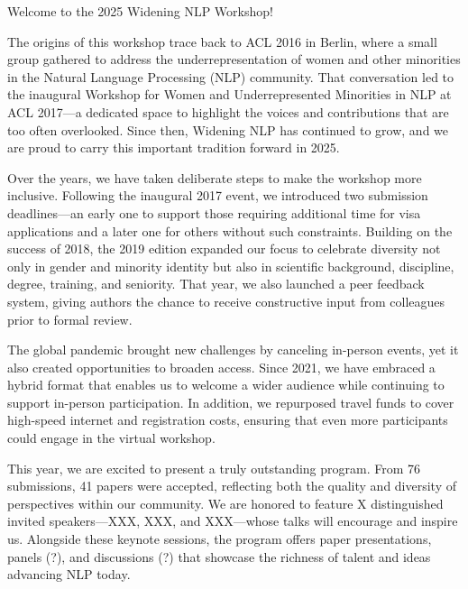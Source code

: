 Welcome to the 2025 Widening NLP Workshop!

\vspace{\baselineskip}

The origins of this workshop trace back to ACL 2016 in Berlin, where a small group gathered to address the underrepresentation of women and other minorities in the Natural Language Processing (NLP) community. That conversation led to the inaugural Workshop for Women and Underrepresented Minorities in NLP at ACL 2017—a dedicated space to highlight the voices and contributions that are too often overlooked. Since then, Widening NLP has continued to grow, and we are proud to carry this important tradition forward in 2025.

\vspace{\baselineskip}

Over the years, we have taken deliberate steps to make the workshop more inclusive. Following the inaugural 2017 event, we introduced two submission deadlines—an early one to support those requiring additional time for visa applications and a later one for others without such constraints. Building on the success of 2018, the 2019 edition expanded our focus to celebrate diversity not only in gender and minority identity but also in scientific background, discipline, degree, training, and seniority. That year, we also launched a peer feedback system, giving authors the chance to receive constructive input from colleagues prior to formal review. 

\vspace{\baselineskip}

The global pandemic brought new challenges by canceling in-person events, yet it also created opportunities to broaden access. Since 2021, we have embraced a hybrid format that enables us to welcome a wider audience while continuing to support in-person participation. In addition, we repurposed travel funds to cover high-speed internet and registration costs, ensuring that even more participants could engage in the virtual workshop.

\vspace{\baselineskip}

This year, we are excited to present a truly outstanding program. From 76 submissions, 41 papers were accepted, reflecting both the quality and diversity of perspectives within our community. We are honored to feature X distinguished invited speakers—XXX, XXX, and XXX—whose talks will encourage and inspire us. Alongside these keynote sessions, the program offers paper presentations, panels (?), and discussions (?) that showcase the richness of talent and ideas advancing NLP today.

